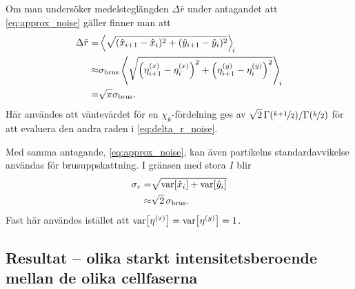 Om man undersöker medelsteglängden $\Delta{\bar{r}}$ under antagandet att \eqref{eq:approx_noise} gäller finner man att
\begin{equation}\label{eq:delta_r_noise}
\begin{aligned}
\Delta{\bar{r}} =& 
\ev{\sqrt{ (\hat{x}_{i+1}-\hat{x}_{i})^2 + (\hat{y}_{i+1}-\hat{y}_{i})^2 } }_{\!i}
\\
\approx& 
\sigma_\text{brus} \ev{ \sqrt{ \left(\eta^{(x)}_{i+1} - \eta^{(x)}_{i}\right)^2 + \left(\eta^{(y)}_{i+1}-\eta^{(y)}_{i}\right)^2} }_{\!i} 
\\
=&\sqrt{\pi} \sigma_\text{brus}.
\end{aligned}
\end{equation}
Här användes att väntevärdet för en $\chi_k$-fördelning ges av
$\sqrt{2}\,\Gamma(\nicefrac{k+1}{2})/\Gamma(\nicefrac{k}{2})$ \cite{wiki:chi-distribution}
för att evaluera den andra raden i \eqref{eq:delta_r_noise}.\footnotemark{}

Med samma antagande, \eqref{eq:approx_noise}, kan även partikelns standardavvikelse användas för brusuppskattning. I gränsen med stora $I$ blir
\begin{equation}\label{eq:sigma_r_noise}
\begin{aligned}
\sigma_r =& 
\sqrt{\text{var}\!\left[\hat{x}_i\right] + \text{var}\!\left[\hat{y}_{i}\right] }\\
\approx&\sqrt{2}\,\sigma_\text{brus}.
\end{aligned}
\end{equation}
Fast här användes istället att $\text{var}\!\left[\eta^{(x)}\right] = \text{var}\!\left[\eta^{(y)}\right] =1$.


\subsection{Resultat -- olika starkt intensitetsberoende mellan de olika cellfaserna} \label{sec:resultat-storleksberoende}

